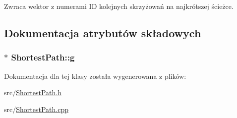 Zwraca wektor z numerami I\-D kolejnych skrzyżowań na najkrótszej ścieżce. 



\subsection{Dokumentacja atrybutów składowych}
\hypertarget{class_shortest_path_a368d0008b535477ef2831958c8338bf1}{
\subsubsection[{g}]{$\ast$ Shortest\-Path\-::g\hspace{0.3cm}{\ttfamily [private]}}}\label{class_shortest_path_a368d0008b535477ef2831958c8338bf1}


Dokumentacja dla tej klasy została wygenerowana z plików\-:\begin{DoxyCompactItemize}
\item 
src/\hyperlink{_shortest_path_8h}{Shortest\-Path.\-h}\item 
src/\hyperlink{_shortest_path_8cpp}{Shortest\-Path.\-cpp}\end{DoxyCompactItemize}
